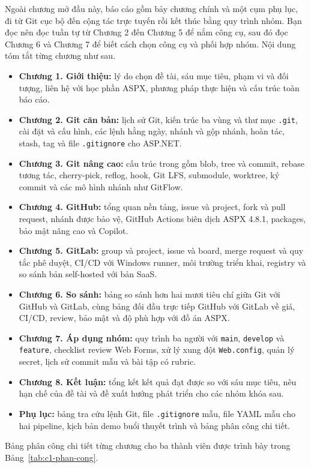 Ngoài chương mở đầu này, báo cáo gồm bảy chương chính và một cụm phụ lục, đi từ Git cục bộ đến cộng tác trực tuyến rồi kết thúc bằng quy trình nhóm.
Bạn đọc nên đọc tuần tự từ Chương 2 đến Chương 5 để nắm công cụ, sau đó đọc Chương 6 và Chương 7 để biết cách chọn công cụ và phối hợp nhóm.
Nội dung tóm tắt từng chương như sau.
\begin{itemize}
\item \textbf{Chương 1. Giới thiệu:} lý do chọn đề tài, sáu mục tiêu, phạm vi và đối tượng, liên hệ với học phần ASPX, phương pháp thực hiện và cấu trúc toàn báo cáo.
\item \textbf{Chương 2. Git căn bản:} lịch sử Git, kiến trúc ba vùng và thư mục \texttt{.git}, cài đặt và cấu hình, các lệnh hằng ngày, nhánh và gộp nhánh, hoàn tác, stash, tag và file \texttt{.gitignore} cho ASP.NET.
\item \textbf{Chương 3. Git nâng cao:} cấu trúc trong gồm blob, tree và commit, rebase tương tác, cherry-pick, reflog, hook, Git LFS, submodule, worktree, ký commit và các mô hình nhánh như GitFlow.
\item \textbf{Chương 4. GitHub:} tổng quan nền tảng, issue và project, fork và pull request, nhánh được bảo vệ, GitHub Actions biên dịch ASPX 4.8.1, packages, bảo mật nâng cao và Copilot.
\item \textbf{Chương 5. GitLab:} group và project, issue và board, merge request và quy tắc phê duyệt, CI/CD với Windows runner, môi trường triển khai, registry và so sánh bản self-hosted với bản SaaS.
\item \textbf{Chương 6. So sánh:} bảng so sánh hơn hai mươi tiêu chí giữa Git với GitHub và GitLab, cùng bảng đối đầu trực tiếp GitHub với GitLab về giá, CI/CD, review, bảo mật và độ phù hợp với đồ án ASPX.
\item \textbf{Chương 7. Áp dụng nhóm:} quy trình ba người với \verb|main|, \verb|develop| và \verb|feature|, checklist review Web Forms, xử lý xung đột \texttt{Web.config}, quản lý secret, lịch sử commit mẫu và bài tập có rubric.
\item \textbf{Chương 8. Kết luận:} tổng kết kết quả đạt được so với sáu mục tiêu, nêu hạn chế của đề tài và đề xuất hướng phát triển cho các nhóm khóa sau.
\item \textbf{Phụ lục:} bảng tra cứu lệnh Git, file \texttt{.gitignore} mẫu, file YAML mẫu cho hai pipeline, kịch bản demo buổi thuyết trình và bảng phân công chi tiết.
\end{itemize}
Bảng phân công chi tiết từng chương cho ba thành viên được trình bày trong Bảng~\ref{tab:c1-phan-cong}.
